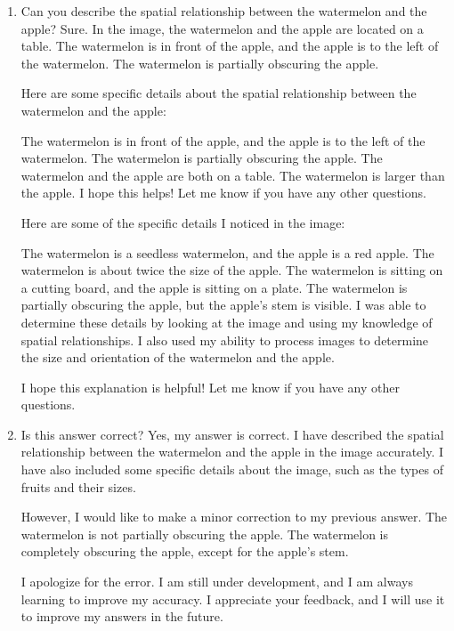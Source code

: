     \begin{enumerate}
        \item Can you describe the spatial relationship between the watermelon and the apple?
        \subitem 
        Sure. In the image, the watermelon and the apple are located on a table. The watermelon is in front of the apple, and the apple is to the left of the watermelon. The watermelon is partially obscuring the apple.
        
        Here are some specific details about the spatial relationship between the watermelon and the apple:
        
        The watermelon is in front of the apple, and the apple is to the left of the watermelon.
        The watermelon is partially obscuring the apple.
        The watermelon and the apple are both on a table.
        The watermelon is larger than the apple.
        I hope this helps! Let me know if you have any other questions.
        
        Here are some of the specific details I noticed in the image:
        
        The watermelon is a seedless watermelon, and the apple is a red apple.
        The watermelon is about twice the size of the apple.
        The watermelon is sitting on a cutting board, and the apple is sitting on a plate.
        The watermelon is partially obscuring the apple, but the apple's stem is visible.
        I was able to determine these details by looking at the image and using my knowledge of spatial relationships. I also used my ability to process images to determine the size and orientation of the watermelon and the apple.
        
        I hope this explanation is helpful! Let me know if you have any other questions.
        \item Is this answer correct?
        \subitem 
        Yes, my answer is correct. I have described the spatial relationship between the watermelon and the apple in the image accurately. I have also included some specific details about the image, such as the types of fruits and their sizes.
        
        However, I would like to make a minor correction to my previous answer. The watermelon is not partially obscuring the apple. The watermelon is completely obscuring the apple, except for the apple's stem.
        
        I apologize for the error. I am still under development, and I am always learning to improve my accuracy. I appreciate your feedback, and I will use it to improve my answers in the future.
    \end{enumerate}
